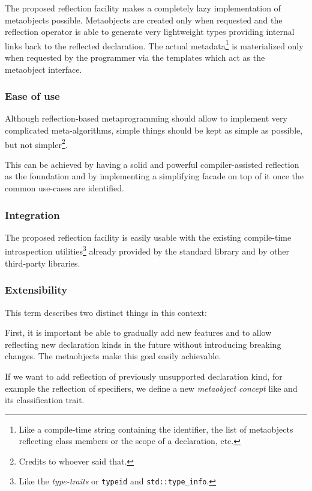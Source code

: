 The proposed reflection facility makes a completely lazy implementation of
metaobjects possible. Metaobjects are created only when requested and
the reflection operator is able to generate very
lightweight types providing internal links back to the reflected declaration.
The actual
metadata\footnote{Like a compile-time string containing the identifier,
the list of metaobjects reflecting class members or the scope of a declaration,
etc.} is materialized only when requested by the programmer via the
templates which act as the metaobject interface.

\subsubsection{Ease of use}
\label{design-ease-of-use}

Although reflection-based metaprogramming should allow to implement very
complicated meta-algorithms, simple things should be kept as simple as possible,
but not simpler\footnote{Credits to whoever said that.}.

This can be achieved by having a solid and powerful compiler-assisted reflection
as the foundation and by implementing a simplifying facade on top of it once
the common use-cases are identified.

\subsubsection{Integration}
\label{design-integration}

The proposed reflection facility is easily
usable with the existing compile-time introspection utilities\footnote{Like the
{\em type-traits} or \texttt{typeid} and \texttt{std::type\_info}.}
already provided by the standard library and by other third-party libraries.

\subsubsection{Extensibility}
\label{design-extensibility}

This term describes two distinct things in this context:

First, it is important be able to gradually add new features and to allow
reflecting new declaration kinds in the future without introducing breaking changes.
The metaobjects make this goal easily achievable.

If we want to add reflection of previously unsupported declaration kind, for example
the reflection of specifiers, we define a new {\em metaobject concept} like
 and its classification trait.

